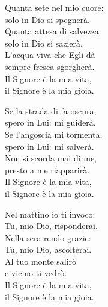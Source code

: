 
\strofa Quanta sete nel mio cuore:\\
solo in Dio si spegnerà.\\
Quanta attesa di salvezza:\\
solo in Dio si sazierà.\\
L'acqua viva che Egli dà\\
sempre fresca sgorgherà.\\
Il Signore è la mia vita,\\
il Signore è la mia gioia.

\spazio

\strofa Se la strada di fa oscura,\\
spero in Lui: mi guiderà.\\
Se l'angoscia mi tormenta,\\
spero in Lui: mi salverà.\\
Non si scorda mai di me,\\
presto a me riapparirà.\\
Il Signore è la mia vita,\\
il Signore è la mia gioia.

\spazio

\strofa Nel mattino io ti invoco:\\
Tu, mio Dio, risponderai.\\
Nella sera rendo grazie:\\
Tu, mio Dio, ascolterai.\\
Al tuo monte salirò\\
e vicino ti vedrò.\\
Il Signore è la mia vita,\\
il Signore è la mia gioia.
